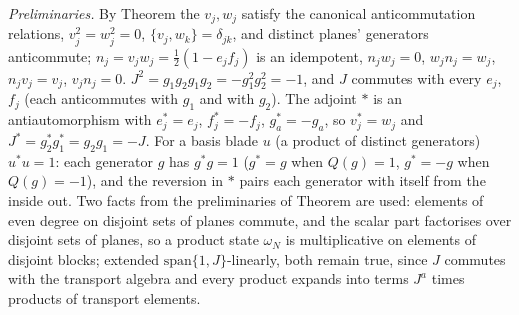 \emph{Preliminaries.} By Theorem  the $v_{j}, w_{j}$ satisfy the canonical anticommutation relations, $v_{j}^{2} = w_{j}^{2} = 0$, $\{v_{j}, w_{k}\} = \delta_{jk}$, and distinct planes' generators anticommute; $n_{j} = v_{j}w_{j} = \tfrac12(1 - e_{j}f_{j})$ is an idempotent, $n_{j}w_{j} = 0$, $w_{j}n_{j} = w_{j}$, $n_{j}v_{j} = v_{j}$, $v_{j}n_{j} = 0$. $J^{2} = g_{1}g_{2}g_{1}g_{2} = -g_{1}^{2}g_{2}^{2} = -1$, and $J$ commutes with every $e_{j}$, $f_{j}$ (each anticommutes with $g_{1}$ and with $g_{2}$). The adjoint $*$ is an antiautomorphism with $e_{j}^{*} = e_{j}$, $f_{j}^{*} = -f_{j}$, $g_{a}^{*} = -g_{a}$, so $v_{j}^{*} = w_{j}$ and $J^{*} = g_{2}^{*}g_{1}^{*} = g_{2}g_{1} = -J$. For a basis blade $u$ (a product of distinct generators) $u^{*}u = 1$: each generator $g$ has $g^{*}g = 1$ ($g^{*} = g$ when $Q(g) = 1$, $g^{*} = -g$ when $Q(g) = -1$), and the reversion in $*$ pairs each generator with itself from the inside out. Two facts from the preliminaries of Theorem  are used: elements of even degree on disjoint sets of planes commute, and the scalar part factorises over disjoint sets of planes, so a product state $\omega_{N}$ is multiplicative on elements of disjoint blocks; extended $\mathrm{span}\{1, J\}$-linearly, both remain true, since $J$ commutes with the transport algebra and every product expands into terms $J^{a}$ times products of transport elements.

